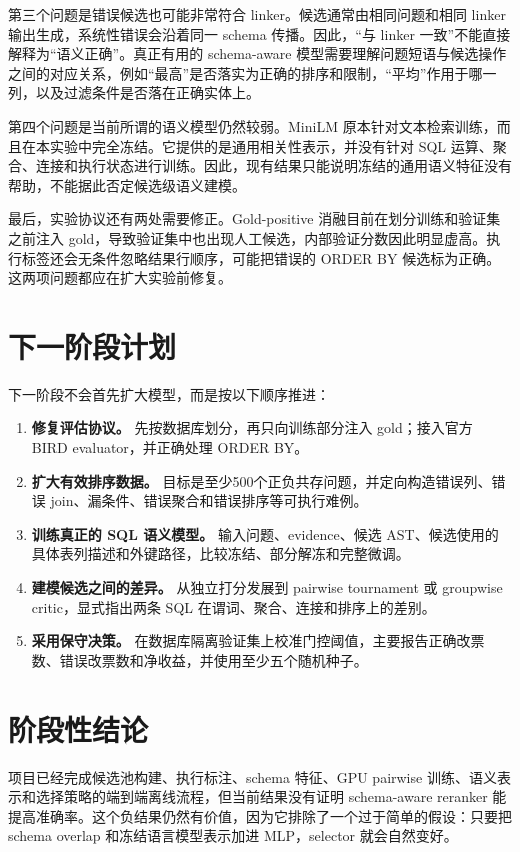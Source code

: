 \documentclass[UTF8,11pt,fontset=windows]{ctexart}
\begin{document}
第三个问题是错误候选也可能非常符合 linker。候选通常由相同问题和相同 linker 输出生成，系统性错误会沿着同一 schema 传播。因此，``与 linker 一致''不能直接解释为``语义正确''。真正有用的 schema-aware 模型需要理解问题短语与候选操作之间的对应关系，例如“最高”是否落实为正确的排序和限制，“平均”作用于哪一列，以及过滤条件是否落在正确实体上。

第四个问题是当前所谓的语义模型仍然较弱。MiniLM 原本针对文本检索训练，而且在本实验中完全冻结。它提供的是通用相关性表示，并没有针对 SQL 运算、聚合、连接和执行状态进行训练。因此，现有结果只能说明冻结的通用语义特征没有帮助，不能据此否定候选级语义建模。

最后，实验协议还有两处需要修正。Gold-positive 消融目前在划分训练和验证集之前注入 gold，导致验证集中也出现人工候选，内部验证分数因此明显虚高。执行标签还会无条件忽略结果行顺序，可能把错误的 ORDER BY 候选标为正确。这两项问题都应在扩大实验前修复。

\section{下一阶段计划}

下一阶段不会首先扩大模型，而是按以下顺序推进：

\begin{enumerate}
  \item \textbf{修复评估协议。} 先按数据库划分，再只向训练部分注入 gold；接入官方 BIRD evaluator，并正确处理 ORDER BY。
  \item \textbf{扩大有效排序数据。} 目标是至少500个正负共存问题，并定向构造错误列、错误 join、漏条件、错误聚合和错误排序等可执行难例。
  \item \textbf{训练真正的 SQL 语义模型。} 输入问题、evidence、候选 AST、候选使用的具体表列描述和外键路径，比较冻结、部分解冻和完整微调。
  \item \textbf{建模候选之间的差异。} 从独立打分发展到 pairwise tournament 或 groupwise critic，显式指出两条 SQL 在谓词、聚合、连接和排序上的差别。
  \item \textbf{采用保守决策。} 在数据库隔离验证集上校准门控阈值，主要报告正确改票数、错误改票数和净收益，并使用至少五个随机种子。
\end{enumerate}

\section{阶段性结论}

项目已经完成候选池构建、执行标注、schema 特征、GPU pairwise 训练、语义表示和选择策略的端到端离线流程，但当前结果没有证明 schema-aware reranker 能提高准确率。这个负结果仍然有价值，因为它排除了一个过于简单的假设：只要把 schema overlap 和冻结语言模型表示加进 MLP，selector 就会自然变好。
\end{document}
